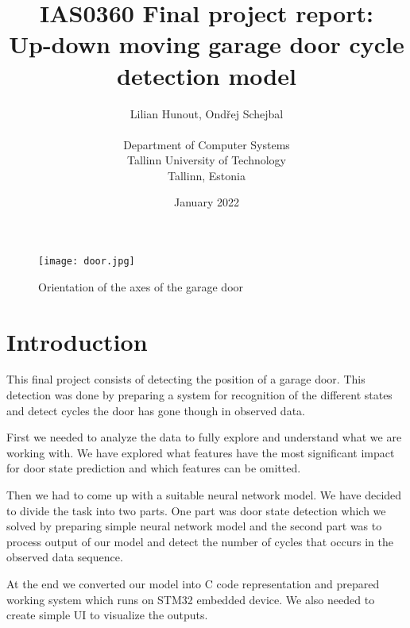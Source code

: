 \documentclass[12pt, letterpaper]{article}
\begin{document}
\title{
\textbf{IAS0360 Final project report:\\
Up-down moving garage door cycle detection model}
}

\author{Lilian Hunout, Ondřej Schejbal\\\\
Department of Computer Systems\\
Tallinn University of Technology\\
Tallinn, Estonia}

\date{January 2022}

\maketitle

\begin{figure}[H]
    \centering
    \texttt{[image: door.jpg]}
    \caption{Orientation of the axes of the garage door}
    \label{fig:door}
\end{figure}

\newpage
\tableofcontents
\listoffigures

\newpage
\section{Introduction}
This final project consists of detecting the position of a garage door. This detection was done by preparing a system for recognition of the different states and detect cycles the door has gone though in observed data.

First we needed to analyze the data to fully explore and understand what we are working with. We have explored what features have the most significant impact for door state prediction and which features can be omitted.

Then we had to come up with a suitable neural network model. We have decided to divide the task into two parts. One part was door state detection which we solved by preparing simple neural network model and the second part was to process output of our model and detect the number of cycles that occurs in the observed data sequence.

At the end we converted our model into C code representation and prepared working system which runs on STM32 embedded device. We also needed to create simple UI to visualize the outputs.

\newpage
\end{document}

